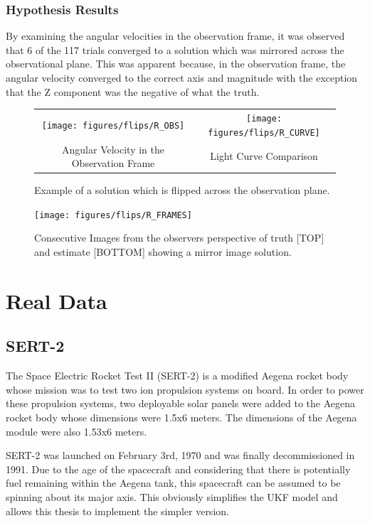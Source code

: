 \subsubsection{Hypothesis Results}

By examining the angular velocities in the observation frame, it was observed that 6 of the 117 trials converged to a solution which was mirrored across the observational plane. This was apparent because, in the observation frame, the angular velocity converged to the correct axis and magnitude with the exception that the Z component was the negative of what the truth.

\begin{figure}[ht]
	\begin{tabular}{cc}
		\texttt{[image: figures/flips/R\_OBS]} &
		\texttt{[image: figures/flips/R\_CURVE]} \\
		Angular Velocity in the Observation Frame & Light Curve Comparison
	\end{tabular}
	\caption{Example of a solution which is flipped across the observation plane.}
\end{figure}

\begin{figure}[ht]
	\begin{center}
		\texttt{[image: figures/flips/R\_FRAMES]}
	\end{center}
	\caption{Consecutive Images from the observers perspective of truth [TOP] and estimate [BOTTOM] showing a mirror image solution.}
\end{figure}

\section{Real Data}

\subsection{SERT-2}

The Space Electric Rocket Test II (SERT-2) is a modified Aegena rocket body whose mission was to test two ion propulsion systems on board. \cite{sert2} In order to power these propulsion systems, two deployable solar panels were added to the Aegena rocket body whose dimensions were 1.5x6 meters. The dimensions of the Aegena module were also 1.53x6 meters.

SERT-2 was launched on February 3rd, 1970 and was finally decommissioned in 1991. Due to the age of the spacecraft and considering that there is potentially fuel remaining within the Aegena tank, this spacecraft can be assumed to be spinning about its major axis. This obviously simplifies the UKF model and allows this thesis to implement the simpler version.

